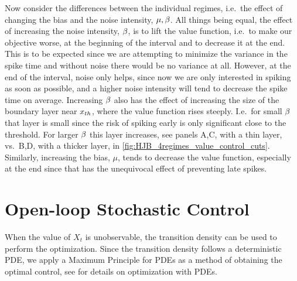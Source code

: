 \documentclass[12pt]{iopart}
\begin{document}
Now consider the differences between the individual regimes, i.e.\ the
effect of changing the bias and the noise intensity, ${\mu },{\beta}$. All things being
equal, the effect of increasing the noise intensity, ${\beta}$, is to lift the value
function, i.e.\ to make our objective worse, at the beginning of the interval
and to decrease it at the end. This is to be expected since we are attempting to
minimize the variance in the spike time and without noise there would be no
variance at all. However, at the end of the interval, noise only helps, since
now we are only interested in spiking as soon as possible, and a higher noise
intensity will tend to decrease the spike time on average. Increasing ${\beta}$ also
has the effect of increasing the size of the boundary layer near ${ x_{th} }$, where
the value function rises steeply. I.e.\ for small ${\beta}$ that layer is small since
the risk of spiking early is only significant close to the threshold. For larger
${\beta}$ this layer increases, see panels A,C, with a thin layer, vs.\ B,D, with a
thicker layer, in \cref{fig:HJB_4regimes_value_control_cuts}. Similarly,
increasing the bias, $\mu$, tends to decrease the value function, especially at
the end since that has the unequivocal effect of preventing late spikes.


\section{Open-loop Stochastic Control}
When the value of $X_t$ is unobservable, the transition density can be used to
perform the optimization. Since the transition density follows a deterministic
PDE, we apply a Maximum Principle for PDEs as a method of obtaining the optimal
control, see \cite{Borzi2012} for details on optimization with PDEs.
\end{document}
